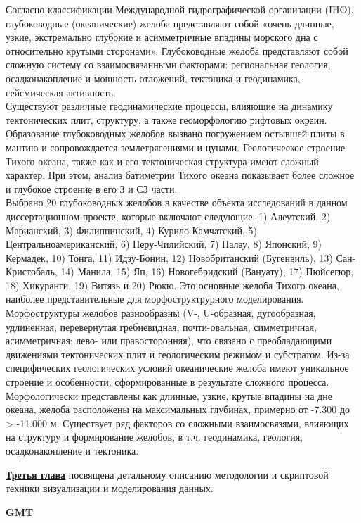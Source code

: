 Согласно классификации Международной гидрографической организации (IHO), глубоководные (океанические) желоба представляют собой «очень длинные, узкие, экстремально глубокие и асимметричные впадины морского дна с относительно крутыми сторонами». Глубоководные желоба представляют собой сложную систему со взаимосвязанными факторами: региональная геология, осадконакопление и мощность отложений, тектоника и геодинамика, сейсмическая активность. \\
Существуют различные геодинамические процессы, влияющие на динамику тектонических плит, структуру, а также геоморфологию рифтовых окраин. Образование глубоководных желобов вызвано погружением остывшей плиты в мантию и сопровождается землетрясениями и цунами. Геологическое строение Тихого океана, также как и его тектоническая структура имеют сложный характер. При этом, анализ батиметрии Тихого океана показывает более сложное и глубокое строение в его З и СЗ части. \\
Выбрано 20 глубоководных желобов в качестве объекта исследований в данном диссертационном проекте, которые включают следующие: 1) Алеутский, 2) Марианский, 3) Филиппинский, 4) Курило-Камчатский, 5) Центральноамериканский, 6) Перу-Чилийский, 7) Палау, 8) Японский, 9) Кермадек, 10) Тонга, 11) Идзу-Бонин, 12) Новобританский (Бугенвиль), 13) Сан-Кристобаль, 14) Манила, 15) Яп, 16) Новогебридский (Вануату), 17) Пюйсегюр, 18) Хикуранги, 19) Витязь и 20) Рюкю. Это основные желоба Тихого океана, наиболее представительные для морфоструктрурного моделирования. \\
	Морфоструктуры желобов разнообразны (V-, U-образная, дугообразная, удлиненная, перевернутая гребневидная, почти-овальная, симметричная, асимметричная: лево- или правосторонняя), что связано с преобладающими движениями тектонических плит и геологическим режимом и субстратом. Из-за специфических геологических условий океанические желоба имеют уникальное строение и особенности, сформированные в результате сложного процесса. Морфологически представлены как длинные, узкие, крутые впадины на дне океана, желоба расположены на максимальных глубинах, примерно от -7.300 до > -11.000 м. Существует ряд факторов со сложными взаимосвязями, влияющих на структуру и формирование желобов, в т.ч. геодинамика, геология, осадконакопление и тектоника. 

\underline{\textbf{Третья глава}} посвящена детальному описанию методологии и скриптовой техники визуализации и моделирования данных.

\underline{\textbf{GMT}} 

